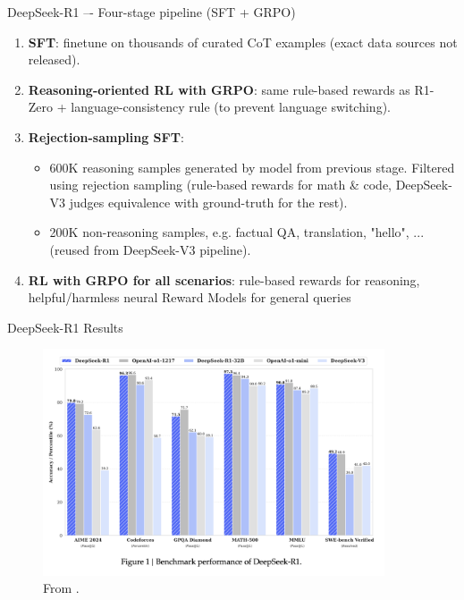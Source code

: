 \documentclass[9pt]{beamer}
\begin{document}
\begin{frame}{DeepSeek-R1 –- Four-stage pipeline (SFT + GRPO)}
\begin{enumerate}\setlength\itemsep{0.4em}
\begin{block}{Motivation}
Problems with DeepSeek-R1-Zero: poor readability, language switching.
\end{block}
\pause
  \item \textbf{SFT}: finetune on thousands of curated CoT examples (exact data sources not released).
  \vspace{1.0em}
  \item \textbf{Reasoning-oriented RL with GRPO}: same rule-based rewards as R1-Zero + language-consistency rule (to prevent language switching).
  \pause
  \vspace{1.0em}
  \item \textbf{Rejection-sampling SFT}: \begin{itemize}
      \item 600K reasoning samples generated by model from previous stage. Filtered using rejection sampling (rule-based rewards for math \& code, DeepSeek-V3 judges equivalence with ground-truth for the rest).
      \vspace{0.5em}
      \pause
      \item 200K non-reasoning samples, e.g. factual QA, translation, "hello", ... (reused from DeepSeek-V3 pipeline).
  \end{itemize}
  \pause
  \vspace{1.0em}
  \item \textbf{RL with GRPO for all scenarios}: rule-based rewards for reasoning, helpful/harmless neural Reward Models for general queries
\end{enumerate}

\end{frame}

\begin{frame}{DeepSeek-R1 Results}

  \begin{figure}
    \centering
    \includegraphics[width=0.9\textwidth]{figures/r1-results.png}
    \caption{From \cite{deepseekai2025deepseekr1incentivizingreasoningcapability}.}
    \label{fig:trl10}
  \end{figure}
  
\end{frame}
\end{document}
